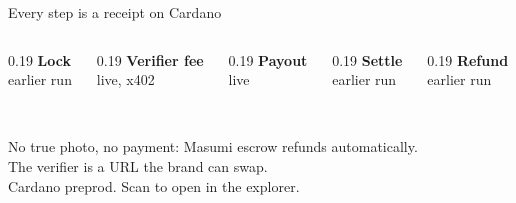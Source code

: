 \begin{frame}{Every step is a receipt on Cardano}
  \centering\scriptsize
  \begin{columns}[T]
    \begin{column}{0.19\textwidth}\centering
      {\bfseries Lock}\\{\color{cardano}earlier run}\\[0.3em]\qrcode[height=1.6cm]{\UrlLock}\\[0.2em]\TxLock
    \end{column}
    \begin{column}{0.19\textwidth}\centering
      {\bfseries Verifier fee}\\{\color{okgreen}live, x402}\\[0.3em]\qrcode[height=1.6cm]{\UrlFee}\\[0.2em]\TxFee
    \end{column}
    \begin{column}{0.19\textwidth}\centering
      {\bfseries Payout}\\{\color{okgreen}live}\\[0.3em]\qrcode[height=1.6cm]{\UrlPayout}\\[0.2em]\TxPayout
    \end{column}
    \begin{column}{0.19\textwidth}\centering
      {\bfseries Settle}\\{\color{cardano}earlier run}\\[0.3em]\qrcode[height=1.6cm]{\UrlSettle}\\[0.2em]\TxSettle
    \end{column}
    \begin{column}{0.19\textwidth}\centering
      {\bfseries Refund}\\{\color{cardano}earlier run}\\[0.3em]\qrcode[height=1.6cm]{\UrlRefund}\\[0.2em]\TxRefund
    \end{column}
  \end{columns}
  \vspace{1em}
  {\small No true photo, no payment: Masumi escrow refunds automatically.\\
  The verifier is a URL the brand can swap.}\\[0.4em]
  Cardano preprod. Scan to open in the explorer.
\end{frame}
